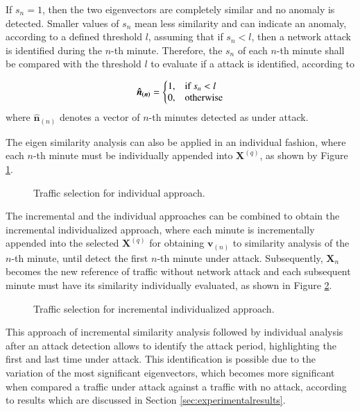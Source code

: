 \documentclass[review]{elsarticle}
\begin{document}
If $s_n = 1$, then the two eigenvectors are completely similar and no anomaly is detected. Smaller values of $s_n$ mean less similarity and can indicate an anomaly, according to a defined 
threshold $l$, assuming that if $s_n < l$, then a network attack is identified during the $n$-th minute. Therefore, the $s_n$ of each $n$-th minute shall be compared with the threshold $l$ to evaluate if a attack is identified, according to

\begin{equation}\label{eq:eq14}
  \boldsymbol{\hat{n}_{(n)}}=\left\{
  \begin{array}{@{}ll@{}}
    1, & \text{if}\ s_n < l \\
    0, & \text{otherwise}
  \end{array}\right.
\end{equation}
where $\boldsymbol{\hat{n}}_{(n)}$ denotes a vector of $n$-th minutes detected as under attack.

The eigen similarity analysis can also be applied in an individual fashion, where each $n$-th minute must be individually appended into $\boldsymbol{X}^{(q)}$, as shown by Figure \ref{fig:fig9}.

\begin{figure}[h!]
     \caption{Traffic selection for individual approach.}
     \label{fig:fig9}
\end{figure}

The incremental and the individual approaches can be combined to obtain the incremental individualized approach, where each minute is incrementally appended into the selected $\boldsymbol{X}^{(q)}$ for obtaining $\boldsymbol{v}_{(n)}$ to similarity analysis of the $n$-th minute, until detect the first $n$-th minute under attack. Subsequently, $\boldsymbol{X}_n$ becomes the new reference of traffic without network attack and each subsequent minute must have its similarity individually evaluated, as shown in Figure \ref{fig:fig2}.

\begin{figure}[h!]
     \caption{Traffic selection for incremental individualized approach.}
     \label{fig:fig2}
\end{figure}

This approach of incremental similarity analysis followed by individual analysis after an attack detection allows to identify the attack period, highlighting the first and last time under attack. This identification is possible due to the variation of the most significant eigenvectors, which becomes more significant when compared a traffic under attack against a traffic with no attack, according to results which are discussed in Section \ref{sec:experimentalresults}.
\end{document}
